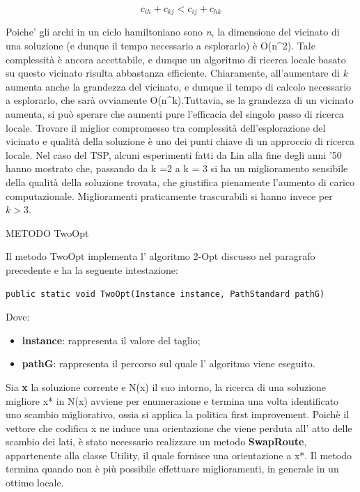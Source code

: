 \documentclass[11pt]{article}
\begin{document}
$$c_{ih} + c_{kj} < c_{ij} + c_{hk}$$


Poiche' gli archi in un ciclo hamiltoniano sono \textit{n}, la dimensione del vicinato di una soluzione (e dunque il tempo necessario a esplorarlo) è O(n^2). Tale complessità è ancora accettabile, e dunque un algoritmo di ricerca locale basato su questo vicinato risulta abbastanza efficiente. Chiaramente, all'aumentare di \textit{k} aumenta anche la grandezza del vicinato, e dunque il tempo di calcolo necessario a esplorarlo, che sarà ovviamente O(n^k).Tuttavia, se la grandezza di un vicinato aumenta, si può sperare che aumenti pure l'efficacia del singolo passo di ricerca locale. Trovare il miglior compromesso tra complessità dell'esplorazione del vicinato e qualità della soluzione è uno dei punti chiave di un approccio di ricerca locale.
Nel caso del TSP, alcuni esperimenti fatti da Lin alla fine degli anni '50 hanno mostrato che, passando da k =2 a k = 3 si ha un miglioramento sensibile della qualità della soluzione trovata, che giustifica pienamente l'aumento di carico computazionale. Miglioramenti praticamente trascurabili si hanno invece per $k > 3$.

\vspace{2\baselineskip}
METODO TwoOpt
\vspace{2\baselineskip}

Il metodo TwoOpt implementa l' algoritmo 2-Opt discusso nel paragrafo precedente e ha la seguente intestazione:

\begin{lstlisting}
public static void TwoOpt(Instance instance, PathStandard pathG)
\end{lstlisting}

Dove:

\begin{itemize}
    \item \textbf{instance}: rappresenta il valore del taglio;
    \item \textbf{pathG}: rappresenta il percorso sul quale l' algoritmo viene eseguito.
\end{itemize}

Sia \textbf{x} la soluzione corrente e N(x) il suo intorno, la ricerca di una soluzione migliore x* in N(x) avviene per enumerazione e termina una volta identificato uno scambio migliorativo, ossia si applica la politica first improvement. Poichè il vettore che codifica x ne induce una orientazione che viene perduta all' atto delle scambio dei lati, è stato necessario realizzare un metodo \textbf{SwapRoute}, appartenente alla classe Utility, il quale fornisce una orientazione a x*. Il metodo termina quando non è più possibile effettuare miglioramenti, in generale in un ottimo locale.
\end{document}
